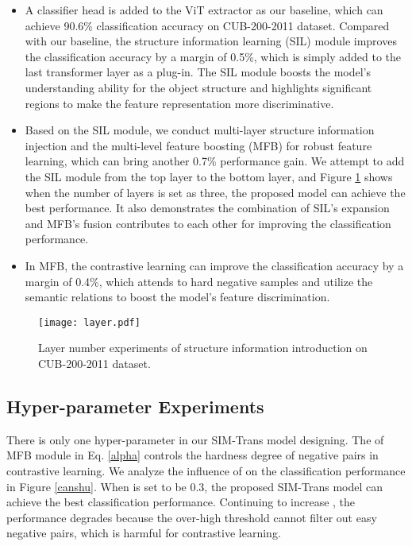 \documentclass[sigconf, nonacm]{acmart}
\begin{document}
\begin{itemize}[leftmargin=30pt]
\item {A classifier head is added to the ViT extractor as our baseline, which can achieve 90.6\% classification accuracy on CUB-200-2011 dataset. Compared with our baseline, the structure information learning (SIL) module improves the classification accuracy by a margin of 0.5\%, which is simply added to the last transformer layer as a plug-in. The SIL module boosts the model’s understanding ability for the object structure and highlights significant regions to make the feature representation more discriminative.
}

\item {Based on the SIL module, we conduct multi-layer structure information injection and the multi-level feature boosting (MFB) for robust feature learning, which can bring another 0.7\% performance gain. We attempt to add the SIL module from the top layer to the bottom layer, and Figure \ref{layer} shows when the number of layers is set as three, the proposed model can achieve the best performance. It also demonstrates the combination of SIL’s expansion and MFB’s fusion contributes to each other for improving the classification performance.
}
\item {In MFB, the contrastive learning can improve the classification accuracy by a margin of 0.4\%, which attends to hard negative samples and utilize the semantic relations to boost the model's feature discrimination.}


\end{itemize}





\begin{figure}[!t]
  \centering
  \texttt{[image: layer.pdf]}
  \caption{Layer number experiments of structure information introduction on CUB-200-2011 dataset.}
  \label{layer}
\end{figure}












\subsection{Hyper-parameter Experiments}


There is only one hyper-parameter in our SIM-Trans model designing. The  of MFB module in Eq. \ref{alpha} controls the hardness degree of negative pairs in contrastive learning. We analyze the influence of  on the classification performance in Figure \ref{canshu}. When  is set to be 0.3, the proposed SIM-Trans model can achieve the best classification performance. Continuing to increase , the performance degrades because the over-high threshold cannot filter out easy negative pairs, which is harmful for contrastive learning.
\end{document}
